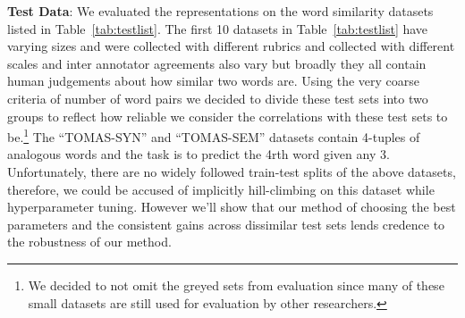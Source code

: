 \documentclass[11pt]{article}
\begin{document}
\textbf{Test Data}: We evaluated the representations on the
word similarity datasets listed in Table~\ref{tab:testlist}. The first
10 datasets in Table~\ref{tab:testlist} have varying sizes and were
collected with different rubrics and collected with different
scales and inter annotator agreements also vary but broadly they all
contain human judgements about how similar two words are. Using the
very coarse criteria of number of word pairs we decided to divide these test sets
into two groups to reflect how reliable we consider the correlations
with these test sets to be.\footnote{We decided to not omit the greyed
sets from evaluation since many of these small datasets are still used for
evaluation by other researchers.}
The ``TOMAS-SYN'' and ``TOMAS-SEM'' datasets contain 4-tuples of
analogous words and the task is to predict the 4rth word given any
3. Unfortunately, there are no widely followed train-test splits of the above
datasets, therefore, we could be accused of implicitly hill-climbing
on this dataset while hyperparameter tuning. However we'll show that
our method of choosing the best parameters and the consistent gains
across dissimilar test sets lends credence to the robustness of our method.
\end{document}
